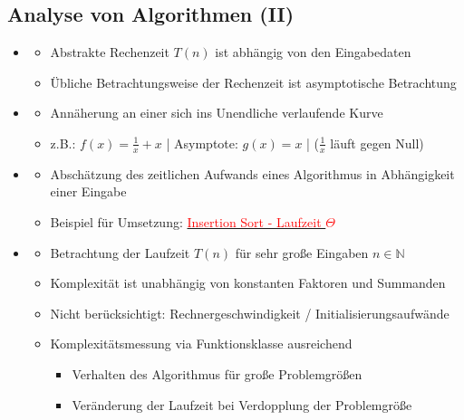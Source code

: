\documentclass[
    12pt,
    a4paper,
    ngerman,
    color=3b,%
    marginpar=false,
    colorback=false,
    leqno,
]{tudaexercise}
\begin{document}
\subsection{Analyse von Algorithmen \textmd{(II)}}\label{Analyse von Algorithmen 2}
\begin{itemize}
    \item {}
          \begin{itemize}
              \item Abstrakte Rechenzeit $T(n)$ ist abhängig von den Eingabedaten
              \item Übliche Betrachtungsweise der Rechenzeit ist asymptotische Betrachtung
          \end{itemize}

    \item {}
          \begin{itemize}
              \item Annäherung an einer sich ins Unendliche verlaufende Kurve
              \item z.B.: $f(x) = \frac{1}{x} + x$ | Asymptote: $g(x)=x$ | ($\frac{1}{x}$ läuft gegen Null)
          \end{itemize}

    \item {}
          \begin{itemize}
              \item Abschätzung des zeitlichen Aufwands eines Algorithmus in Abhängigkeit einer Eingabe
              \item Beispiel für Umsetzung: \hyperref[insSortLaufzeitTheta]{\textcolor{red}{Insertion Sort - Laufzeit $\Theta$}}
          \end{itemize}

    \item {}
          \begin{itemize}
              \item Betrachtung der Laufzeit $T(n)$ für sehr gro\ss e Eingaben $n \in \mathbb{N}$
              \item Komplexität ist unabhängig von konstanten Faktoren und Summanden
              \item Nicht berücksichtigt: Rechnergeschwindigkeit / Initialisierungsaufwände
              \item Komplexitätsmessung via Funktionsklasse ausreichend
                    \begin{itemize}
                        \item Verhalten des Algorithmus für gro\ss e Problemgrö\ss en
                        \item Veränderung der Laufzeit bei Verdopplung der Problemgrö\ss e
                    \end{itemize}
          \end{itemize}


\end{itemize}
\end{document}

